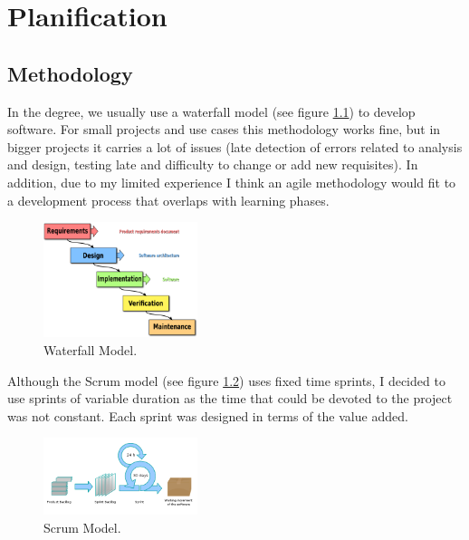 \chapter{Planification}

\section{Methodology}
In the degree, we usually use a waterfall model (see figure \ref{fig:planification_waterfall_model}) to develop software. For small projects and use cases this methodology
works fine, but in bigger projects it carries a lot of issues (late detection of errors related to analysis and design, testing late and difficulty to change or add new requisites).
In addition, due to my limited experience I think an agile methodology would fit to a development
process that overlaps with learning phases. \\

\begin{figure}[H]
    \begin{center}
        \includegraphics[width=0.4\textwidth]{assets/waterfall_model.png}
        \caption{Waterfall Model. \cite{Waterfall}}
        \label{fig:planification_waterfall_model}
    \end{center}
\end{figure}

Although the Scrum model (see figure \ref{fig:planification_scrum_model}) uses fixed time sprints, I decided to use sprints of variable duration as 
the time that could be devoted to the project was not constant. Each sprint was designed in terms of 
the value added.

\begin{figure}[H]
    \begin{center}
        \includegraphics[width=0.4\textwidth]{assets/scrum.png}
        \caption{Scrum Model. \cite{Scrum}}
        \label{fig:planification_scrum_model}
    \end{center}
\end{figure}

